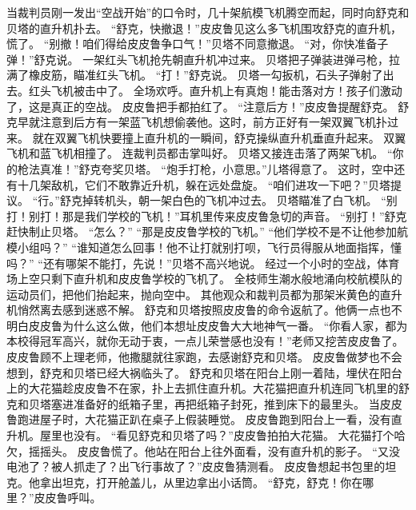 \documentclass[a4paper,12pt,UTF8,twoside]{ctexbook}
\begin{document}
        当裁判员刚一发出“空战开始”的口令时，几十架航模飞机腾空而起，同时向舒克和贝塔的直升机扑去。 
        “舒克，快撤退！”皮皮鲁见这么多飞机围攻舒克的直升机，慌了。 
        “别撤！咱们得给皮皮鲁争口气！”贝塔不同意撤退。 
        “对，你快准备子弹！”舒克说。 
        一架红头飞机抢先朝直升机冲过来。 
        贝塔把子弹装进弹弓枪，拉满了橡皮筋，瞄准红头飞机。 
        “打！”舒克说。 
        贝塔一勾扳机，石头子弹射了出去。红头飞机被击中了。 
        全场欢呼。直升机上有真炮！能击落对方！孩子们激动了，这是真正的空战。 
        皮皮鲁把手都拍红了。 
        “注意后方！”皮皮鲁提醒舒克。 
        舒克早就注意到后方有一架蓝飞机想偷袭他。这时，前方正好有一架双翼飞机扑过来。 
        就在双翼飞机快要撞上直升机的一瞬间，舒克操纵直升机垂直升起来。 
        双翼飞机和蓝飞机相撞了。 
        连裁判员都击掌叫好。 
        贝塔又接连击落了两架飞机。 
        “你的枪法真准！”舒克夸奖贝塔。 
        “炮手打枪，小意思。”儿塔得意了。 
        这时，空中还有十几架敌机，它们不敢靠近升机，躲在远处盘旋。 
        “咱们进攻一下吧？”贝塔提议。 
        “行。”舒克掉转机头，朝一架白色的飞机冲过去。 
        贝塔瞄准了白飞机。 
        “别打！别打！那是我们学校的飞机！”耳机里传来皮皮鲁急切的声音。 
        “别打！”舒克赶快制止贝塔。 
        “怎么？” 
        “那是皮皮鲁学校的飞机。” 
        “他们学校不是不让他参加航模小组吗？” 
        “谁知道怎么回事！他不让打就别打呗，飞行员得服从地面指挥，懂吗？” 
        “还有哪架不能打，先说！”贝塔不高兴地说。 
        经过一个小时的空战，体育场上空只剩下直升机和皮皮鲁学校的飞机了。 
        全枝师生潮水般地涌向校航模队的运动员们，把他们抬起来，抛向空中。 
        其他观众和裁判员都为那架米黄色的直升机悄然离去感到迷惑不解。 
        舒克和贝塔按照皮皮鲁的命令返航了。他俩一点也不明白皮皮鲁为什么这么做，他们本想址皮皮鲁大大地神气一番。 
        “你看人家，都为本校得冠军高兴，就你无动于衷，一点儿荣誉感也没有！”老师又挖苦皮皮鲁了。 
        皮皮鲁顾不上理老师，他撒腿就往家跑，去感谢舒克和贝塔。 
        皮皮鲁做梦也不会想到，舒克和贝塔已经大祸临头了。 
        舒克和贝塔在阳台上刚一着陆，埋伏在阳台上的大花猫趁皮皮鲁不在家，扑上去抓住直升机。大花猫把直升机连同飞机里的舒克和贝塔塞进准备好的纸箱子里，再把纸箱子封死，推到床下的最里头。 
        当皮皮鲁跑进屋子时，大花猫正趴在桌子上假装睡觉。 
        皮皮鲁跑到阳台上一看，没有直升机。屋里也没有。 
        “看见舒克和贝塔了吗？”皮皮鲁拍拍大花猫。 
        大花猫打个哈欠，摇摇头。 
        皮皮鲁慌了。他站在阳台上往外面看，没有直升机的影子。 
        “又没电池了？被人抓走了？出飞行事故了？”皮皮鲁猜测看。 
        皮皮鲁想起书包里的坦克。他拿出坦克，打开舱盖儿，从里边拿出小话筒。 
        “舒克，舒克！你在哪里？”皮皮鲁呼叫。 
\end{document}
